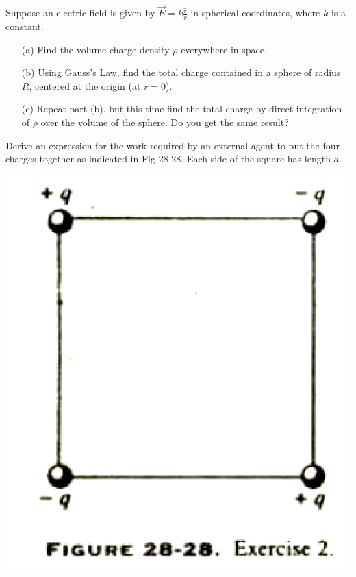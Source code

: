\documentclass[11pt,letterpaper,boxed]{hmcpset}
\begin{document}
	\begin{solution}
		\vfill
	\end{solution}
	\newpage
	
	
	\begin{problem}[Problem 3*]
		Suppose an electric field is given by $\vec{E} = k
		\frac{\hat r}{r}$ in spherical coordinates, where $k$ is a
		constant.
		
		\begin{enumerate}
			\item [(a)] Find the volume charge density $\rho$ everywhere in space.
			\item [(b)] Using Gauss’s Law, find the total charge contained
			in a sphere of radius $R$, centered at the origin (at $r = 0$).
			\item [(c)] Repeat part (b), but this time find the total
			charge by direct integration of $\rho$ over the volume of the sphere. Do you get the same result?
		\end{enumerate}
			
	\end{problem}
	
	\begin{solution}
		\vfill
	\end{solution}
	\newpage
	
	
	\begin{problem}[HRK E28.2]
		Derive an expression for the work required by an external agent to put the four charges together as indicated in Fig 28-28. Each side of the square has length $a$.
		
		\begin{center}
			\includegraphics[scale=0.4]{28-28.png}
		\end{center}
		
	
		
	\end{problem}
	
\end{document}
